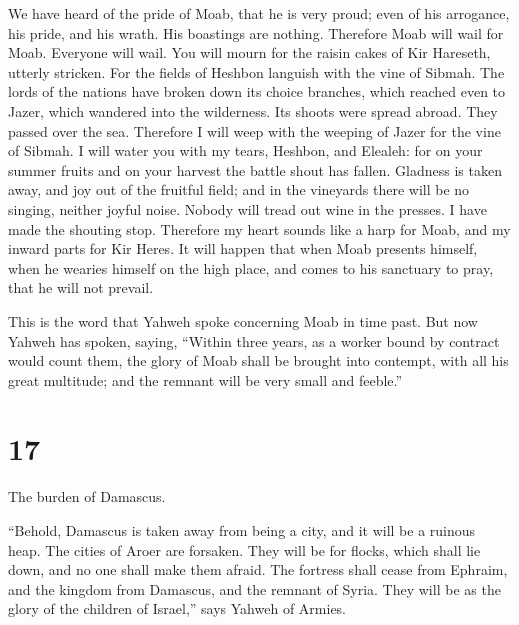  We have heard of the pride of Moab, that he is very
proud; even of his arrogance, his pride, and his wrath. His boastings
are nothing.  Therefore Moab will wail for Moab. Everyone
will wail. You will mourn for the raisin cakes of Kir Hareseth, utterly
stricken.  For the fields of Heshbon languish with the
vine of Sibmah. The lords of the nations have broken down its choice
branches, which reached even to Jazer, which wandered into the
wilderness. Its shoots were spread abroad. They passed over the sea.
 Therefore I will weep with the weeping of Jazer for the
vine of Sibmah. I will water you with my tears, Heshbon, and Elealeh:
for on your summer fruits and on your harvest the battle shout has
fallen.  Gladness is taken away, and joy out of the
fruitful field; and in the vineyards there will be no singing, neither
joyful noise. Nobody will tread out wine in the presses. I have made the
shouting stop.  Therefore my heart sounds like a harp for
Moab, and my inward parts for Kir Heres.  It will happen
that when Moab presents himself, when he wearies himself on the high
place, and comes to his sanctuary to pray, that he will not prevail.

 This is the word that Yahweh spoke concerning Moab in
time past.  But now Yahweh has spoken, saying, ``Within
three years, as a worker bound by contract would count them, the glory
of Moab shall be brought into contempt, with all his great multitude;
and the remnant will be very small and feeble.''

\hypertarget{section-16}{%
\section{17}\label{section-16}}

 The burden of Damascus.

``Behold, Damascus is taken away from being a city, and it will be a
ruinous heap.  The cities of Aroer are forsaken. They will
be for flocks, which shall lie down, and no one shall make them afraid.
 The fortress shall cease from Ephraim, and the kingdom
from Damascus, and the remnant of Syria. They will be as the glory of
the children of Israel,'' says Yahweh of Armies.

